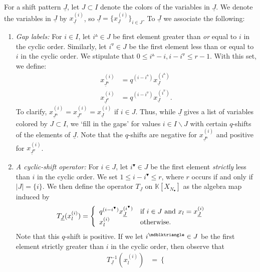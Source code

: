 \documentclass{amsart}
\renewcommand{\triangle}{\vartriangle}
\newcommand{\K}{\mathbb{K}}
\newcommand{\Ju}{{\underline{J}}}
\providecommand{\blacktriangle}{\mdblktriangle}
\theoremstyle{remark}
\numberwithin{thm}{section}
\numberwithin{equation}{section}
\begin{document}
For a shift pattern $\Ju$, let $J\subset I$ denote the colors of the variables in $\Ju$.
We denote the variables in $\Ju$ by $x_{\Ju}^{(i)}$, so $\Ju=\{ x_{\Ju}^{(i)} \}_{i\in J}$.
To $\underline{J}$ we associate the following:
\begin{enumerate}
    \item \textit{Gap labels:} For $i\in I$, let $i^{\triangle}\in J$ be first element greater than \textit{or} equal to $i$ in the cyclic order.
Similarly, let $i^{\triangledown}\in J$ be the first element less than or equal to $i$ in the cyclic order. 
We stipulate that $0\le i^{\triangle}-i, i-i^{\triangledown}\le r-1$.
With this set, we define:
\begin{align*}
   x_{\Ju^\triangle}^{(i)}&=q^{(i-i^{\triangle})}x_{\Ju}^{(i^\triangle)}\\
   x_{\Ju^\triangledown}^{(i)}&=q^{(i-i^{\triangledown})}x_{\Ju}^{(i^\triangledown)}. 
\end{align*}
To clarify, $x_{\Ju^\triangle}^{(i)}=x_{\Ju^\triangledown}^{(i)}=x_{\Ju}^{(i)}$ if $i\in J$.
Thus, while $\Ju$ gives a list of variables colored by $J\subset I$, we `fill in the gaps' for values $i\in I\backslash J$ with certain $q$-shifts of the elements of $\Ju$.
Note that the $q$-shifts are negative for $x_{\Ju^\triangle}^{(i)}$ and positive for $x_{\Ju^\triangledown}^{(i)}$.
    \item \textit{A cyclic-shift operator:} For $i\in J$, let $i^{\blacktriangledown}\in J$ be the first element \textit{strictly} less than $i$ in the cyclic order.
        We set $1\le i-i^\blacktriangledown\le r$, where $r$ occurs if and only if $|J|=\{i\}$. 
        We then define the operator $T_{\Ju}$ on $\K[X_{N_\bullet}]$ as the algebra map induced by
        \begin{align*}
            T_{\Ju}(x_{l}^{(i)})&=
            \left\{
                \begin{array}{ll}
                    q^{(i-i^\blacktriangledown)}x_{\Ju}^{(i^\blacktriangledown)} & \text{if $i\in J$ and $x_{l}=x_{\Ju}^{(i)}$} \\
                     x_{l}^{(i)}&\hbox{otherwise.}
                \end{array}
            \right.
        \end{align*}
	Note that this $q$-shift is positive.
	If we let $i^{\blacktriangle}\in J$ be the first element strictly greater than $i$ in the cyclic order, then observe that
        \begin{align*}
            T^{-1}_{\Ju}(x_{l}^{(i)})&=
            \left\{

\end{align*}
\end{enumerate}
\end{document}
